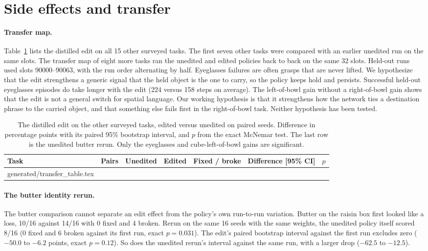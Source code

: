 \documentclass{article}
\makeatletter
\newcommand{\tabinput}[1]{\@@input #1 }
\makeatother
\begin{document}
\FloatBarrier
\section{Side effects and transfer}
\label{app:sidefx}
\paragraph{Transfer map.} Table~\ref{tab:transfer} lists the distilled edit on all 15 other surveyed tasks. The first seven other tasks were compared with an earlier unedited run on the same slots. The transfer map of eight more tasks ran the unedited and edited policies back to back on the same 32 slots. Held-out runs used slots 90000--90063, with the run order alternating by half. Eyeglasses failures are often grasps that are never lifted. We hypothesize that the edit strengthens a generic signal that the held object is the one to carry, so the policy keeps hold and persists. Successful held-out eyeglasses episodes do take longer with the edit (224 versus 158 steps on average). The left-of-bowl gain without a right-of-bowl gain shows that the edit is not a general switch for spatial language. Our working hypothesis is that it strengthens how the network ties a destination phrase to the carried object, and that something else fails first in the right-of-bowl task. Neither hypothesis has been tested.

\begin{table}[htbp]
\centering\fontsize{8}{9.6}\selectfont
\setlength{\tabcolsep}{3.2pt}
\caption{The distilled edit on the other surveyed tasks, edited versus unedited on paired seeds. Difference in percentage points with its paired 95\% bootstrap interval, and $p$ from the exact McNemar test. The last row is the unedited butter rerun. Only the eyeglasses and cube-left-of-bowl gains are significant.}
\label{tab:transfer}
\begin{tabular}{@{}lrrrcll@{}}
\toprule
Task & Pairs & Unedited & Edited & Fixed / broke & Difference [95\% CI] & $p$\\
\midrule
\tabinput{generated/transfer_table.tex}
\bottomrule
\end{tabular}
\end{table}

\paragraph{The butter identity rerun.} The butter comparison cannot separate an edit effect from the policy's own run-to-run variation. Butter on the raisin box first looked like a loss, 10/16 against 14/16 with 0 fixed and 4 broken. Rerun on the same 16 seeds with the same weights, the unedited policy itself scored 8/16 (0 fixed and 6 broken against its first run, exact $p=0.031$). The edit's paired bootstrap interval against the first run excludes zero ($-50.0$ to $-6.2$ points, exact $p=0.12$). So does the unedited rerun's interval against the same run, with a larger drop ($-62.5$ to $-12.5$).
\end{document}
